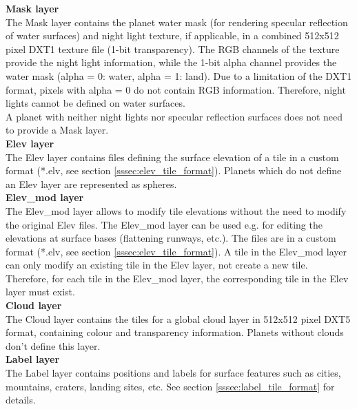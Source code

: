 \documentclass[Orbiter Developer Manual.tex]{subfiles}
\begin{document}
\noindent
\textbf{Mask layer}\\
The Mask layer contains the planet water mask (for rendering specular reflection of water surfaces) and night light texture, if applicable, in a combined  512x512 pixel DXT1 texture file (1-bit transparency). The RGB channels of the texture provide the night light information, while the 1-bit alpha channel provides the water mask (alpha = 0: water, alpha = 1: land). Due to a limitation of the DXT1 format, pixels with alpha = 0 do not contain RGB information. Therefore, night lights cannot be defined on water surfaces.\\
A planet with neither night lights nor specular reflection surfaces does not need to provide a Mask layer.\\

\noindent
\textbf{Elev layer}\\
The Elev layer contains files defining the surface elevation of a tile in a custom format (*.elv, see section \ref{sssec:elev_tile_format}). Planets which do not define an Elev layer are represented as spheres.\\

\noindent
\textbf{Elev\_mod layer}\\
The Elev\_mod layer allows to modify tile elevations without the need to modify the original Elev files. The Elev\_mod layer can be used e.g. for editing the elevations at surface bases (flattening runways, etc.). The files are in a custom format (*.elv, see section \ref{sssec:elev_tile_format}). A tile in the Elev\_mod layer can only modify an existing tile in the Elev layer, not create a new tile. Therefore, for each tile in the Elev\_mod layer, the corresponding tile in the Elev layer must exist.\\

\noindent
\textbf{Cloud layer}\\
The Cloud layer contains the tiles for a global cloud layer in 512x512 pixel DXT5 format, containing colour and transparency information. Planets without clouds don't define this layer.\\

\noindent
\textbf{Label layer}\\
The Label layer contains positions and labels for surface features such as cities, mountains, craters, landing sites, etc. See section \ref{sssec:label_tile_format} for details.
\end{document}
